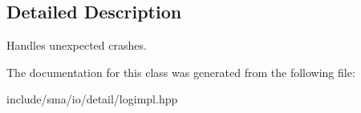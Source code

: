 \subsection{Detailed Description}
Handles unexpected crashes. 

The documentation for this class was generated from the following file\-:\begin{DoxyCompactItemize}
\item 
include/sma/io/detail/logimpl.\-hpp\end{DoxyCompactItemize}
